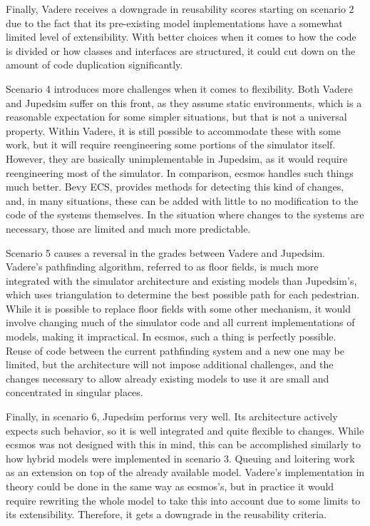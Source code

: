 \documentclass[twoside, 11pt]{article}
\begin{document}
Finally, Vadere receives a downgrade in reusability scores starting on scenario 2 due to the fact that its pre-existing model implementations have a somewhat limited level of extensibility. With better choices when it comes to how the code is divided or how classes and interfaces are structured, it could cut down on the amount of code duplication significantly.

Scenario 4 introduces more challenges when it comes to flexibility. Both Vadere and Jupedsim suffer on this front, as they assume static environments, which is a reasonable expectation for some simpler situations, but that is not a universal property. Within Vadere, it is still possible to accommodate these with some work, but it will require reengineering some portions of the simulator itself. However, they are basically unimplementable in Jupedsim, as it would require reengineering most of the simulator. In comparison, \gls{ecsmos} handles such things much better. Bevy ECS, provides methods for detecting this kind of changes, and, in many situations, these can be added with little to no modification to the code of the systems themselves. In the situation where changes to the systems are necessary, those are limited and much more predictable. 

Scenario 5 causes a reversal in the grades between Vadere and Jupedsim. Vadere's pathfinding algorithm, referred to as floor fields, is much more integrated with the simulator architecture and existing models than Jupedsim's, which uses triangulation to determine the best possible path for each pedestrian. While it is possible to replace floor fields with some other mechanism, it would involve changing much of the simulator code and all current implementations of models, making it impractical. In \gls{ecsmos}, such a thing is perfectly possible. Reuse of code between the current pathfinding system and a new one may be limited, but the architecture will not impose additional challenges, and the changes necessary to allow already existing models to use it are small and concentrated in singular places.

Finally, in scenario 6, Jupedsim performs very well. Its architecture actively expects such behavior, so it is well integrated and quite flexible to changes. While \gls{ecsmos} was not designed with this in mind, this can be accomplished similarly to how hybrid models were implemented in scenario 3. Queuing and loitering work as an extension on top of the already available model. Vadere's implementation in theory could be done in the same way as \gls{ecsmos}'s, but in practice it would require rewriting the whole model to take this into account due to some limits to its extensibility. Therefore, it gets a downgrade in the reusability criteria.
\end{document}
